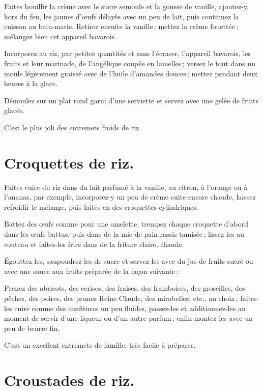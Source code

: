 Faites bouillir la crème avec le sucre semoule et la gousse de vanille,
ajoutez-y, hors du feu, les jaunes d'œufs délayés avec un peu de lait, puis
continuez la cuisson au bain-marie. Retirez ensuite la vanille ; mettez la
crème fouettée ; mélangez bien cet appareil bavarois.

Incorporez au riz, par petites quantités et sans l'écraser, l'appareil
bavarois, les fruits et leur marinade, de l'angélique coupée en lamelles ;
versez le tout dans un moule légèrement graissé avec de l'huile d'amandes
douces ; mettez pendant deux heures à la glace.

Démoulez sur un plat rond garni d’une serviette et servez avec une gelée de
fruits glacée.

C'est le plus joli des entremets froids de riz.

\section*{\centering Croquettes de riz.}
{}

Faites cuire du riz dans du lait parfumé à la vanille, au citron, à l'orange ou à
l'ananas, par exemple, incorporez-y un peu de crème cuite encore chaude, laissez
refroidir le mélange, puis faites-en des croquettes cylindriques.

Battez des œufs comme pour une omelette, trempez chaque croquette d'abord dans
les œufs battus, puis dans de la mie de pain rassis tamisée ; lissez-les au
couteau et faites-les frire dans de la friture claire, chaude.

Égouttez-les, saupoudrez-les de sucre et servez-les avec du jus de fruits sucré
ou avec une sauce aux fruits préparée de la façon suivante :

Prenez des abricots, des cerises, des fraises, des framboises, des groseilles,
des pêches, des poires, des prunes Reine-Claude, des mirabelles, etc., au
choix ; faites-les cuire comme des confitures un peu fluides, passez-les et
additionnez-les au moment de servir d’une liqueur ou d'un autre parfum ; enfin
montez-les avec un peu de beurre fin.

C'est un excellent entremets de famille, très facile à préparer.

\section*{\centering Croustades de riz.}
{}

